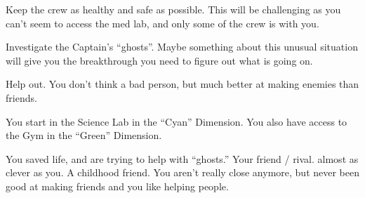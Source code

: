 \documentclass[char]{TMFHope}
\begin{document}
\begin{itemz}[Goals]
	\item Keep the crew as healthy and safe as possible. This will be challenging as you can't seem to access the med lab, and only some of the crew is with you.
	\item Investigate the Captain's ``ghosts''. Maybe something about this unusual situation will give you the breakthrough you need to figure out what is going on.
	\item Help \cDip{} out. You don't think \cDip{\they} \cDip{\are} a bad person, but \cDip{\they} \cDip{\are} much better at making enemies than friends.
\end{itemz}

\begin{itemz}[Notes]
	\item You start in the Science Lab in the ``Cyan'' Dimension. You also have access to the Gym in the ``Green'' Dimension. 
\end{itemz}

\begin{contacts}
	\contact{\cCap{}} You saved \cCap{\their} life, and are trying to help \cCap{\them} with \cCap{\their} ``ghosts.''
	\contact{\cSci{}} Your friend / rival. \cSci{\They} \cSci{\are} almost as clever as you.
	\contact{\cDip{}} A childhood friend. You aren't really close anymore, but \cDip{\they} \cDip{\have} never been good at making friends and you like helping people.
\end{contacts}
\end{document}
